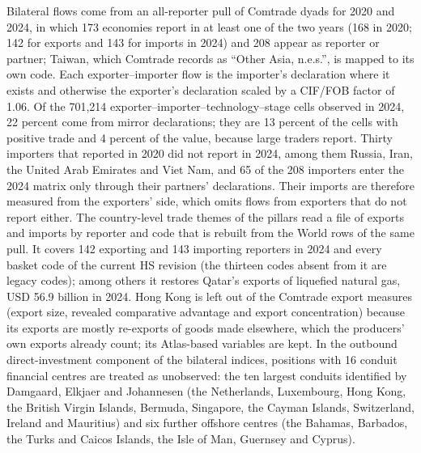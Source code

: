 Bilateral flows come from an all-reporter pull of Comtrade dyads \citep{uncomtrade} for 2020 and
2024, in which 173 economies report in at least one of the two years (168 in 2020; 142 for
exports and 143 for imports in 2024) and 208 appear as reporter or partner; Taiwan, which Comtrade
records as ``Other Asia, n.e.s.'', is mapped to its own code. Each exporter--importer flow is the
importer's declaration where it exists and otherwise the exporter's declaration scaled by a
CIF/FOB factor of 1.06. Of the 701,214 exporter--importer--technology--stage cells observed in
2024, 22 percent come from mirror declarations; they are 13 percent of the cells with positive
trade and 4 percent of the value, because large traders report. Thirty importers that reported in
2020 did not report in 2024, among them Russia, Iran, the United Arab Emirates and Viet Nam, and
65 of the 208 importers enter the 2024 matrix only through their partners' declarations. Their
imports are therefore measured from the exporters' side, which omits flows from exporters that do
not report either. The country-level trade themes of the pillars read a file of exports and
imports by reporter and code that is rebuilt from the World rows of the same pull. It covers 142
exporting and 143 importing reporters in 2024 and every basket code of the current HS revision
(the thirteen codes absent from it are legacy codes); among others it restores Qatar's exports of
liquefied natural gas, USD 56.9 billion in 2024. Hong Kong is left out of the Comtrade export
measures (export size, revealed comparative advantage and export concentration) because its
exports are mostly re-exports of goods made elsewhere, which the producers' own exports already
count; its Atlas-based variables are kept. In the outbound direct-investment component of the
bilateral indices, positions with 16 conduit financial centres are treated as unobserved: the ten
largest conduits identified by Damgaard, Elkjaer and Johannesen (the Netherlands, Luxembourg,
Hong Kong, the British Virgin Islands, Bermuda, Singapore, the Cayman Islands, Switzerland,
Ireland and Mauritius) and six further offshore centres (the Bahamas, Barbados, the Turks and
Caicos Islands, the Isle of Man, Guernsey and Cyprus).


